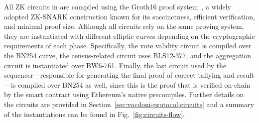 All ZK circuits in \davinci are compiled using the Groth16 proof system~\cite{groth2016size}, a widely adopted ZK-SNARK construction known for its succinctness, efficient verification, and minimal proof size. Although all circuits rely on the same proving system, they are instantiated with different elliptic curves depending on the cryptographic requirements of each phase. Specifically, the vote validity circuit is compiled over the BN254 curve, the census-related circuit uses BLS12-377, and the aggregation circuit is instantiated over BW6-761. Finally, the last circuit used by the sequencer—responsible for generating the final proof of correct tallying and result—is compiled over BN254 as well, since this is the proof that is verified on-chain by the smart contract using Ethereum’s native precompiles. Further details on the circuits are provided in Section~\ref{sec:vocdoni-protocol:circuits} and a summary of the instantiations can be found in Fig.~\ref{fig:circuits-flow}.
